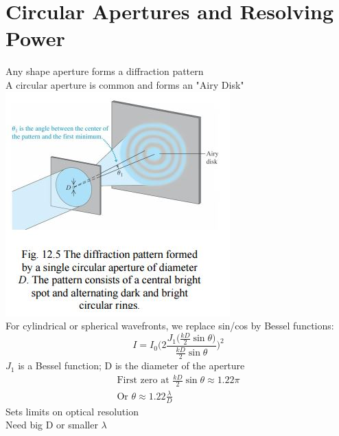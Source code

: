 \documentclass[a4paper, 11pt, fleqn, normalem]{report}
\begin{document}
\section{Circular Apertures and Resolving Power}
Any shape aperture forms a diffraction pattern \\
A circular aperture is common and forms an "Airy Disk" \\
\includegraphics{Airy.jpg} \\
For cylindrical or spherical wavefronts, we replace sin/cos by Bessel functions:
\begin{equation*}
    I = I_{0}\Bigg(2\frac{J_{1}\big(\tfrac{kD}{2}\sin{\theta}\big)}{\tfrac{kD}{2}\sin{\theta}}\Bigg)^{2}
\end{equation*}
$J_{1}$ is a Bessel function; D is the diameter of the aperture
\begin{gather*}
    \text{First zero at }\frac{kD}{2}\sin{\theta} \approx 1.22\pi \\
    \text{Or }\theta \approx 1.22\frac{\lambda}{D}
\end{gather*}
Sets limits on optical resolution \\
Need big D or smaller $\lambda$
\end{document}
